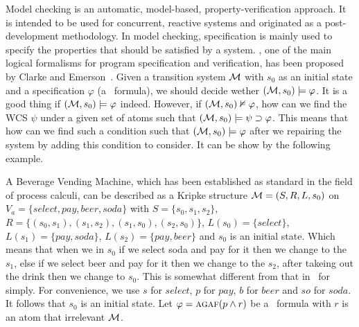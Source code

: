 \documentclass{article}
\begin{document}
Model checking is an automatic, model-based, property-verification approach.
It is intended to be used for concurrent, reactive systems and originated as a post-development methodology.
In model checking, specification is mainly used to specify the properties that should be satisfied by a system. %
\CTL, one of the main logical formalisms for program specification and verification, has been proposed by Clarke and Emerson~\cite{clarke1981design}.
Given a transition system ${\cal M}$ with $s_0$ as an initial state and a specification $\varphi$ (a \CTL\ formula), we should decide wether $({\cal M}, s_0) \models \varphi$. It is a good thing if $({\cal M}, s_0) \models \varphi$ indeed. However, if $({\cal M}, s_0) \nvDash \varphi$, how can we find the WCS $\psi$ under a given set of atoms such that $({\cal M}, s_0) \models \psi \supset \varphi$.
This means that how can we find such a condition such that $({\cal M}, s_0) \models \varphi$ after we repairing the system by adding this condition to consider.
It can be show by the following example.

\begin{example}\label{exmp:1}
A Beverage Vending Machine, which has been established as standard in the field of process calculi, can be described as a Kripke structure ${\cal M}=(S, R, L, s_0)$ on $V_a=\{select, pay, beer, soda\}$ with $S=\{s_0, s_1, s_2\}$, $R=\{(s_0, s_1), (s_1, s_2), (s_1, s_0), (s_2,s_0)\}$, $L(s_0)=\{select\}$, $L(s_1)=\{pay, soda\}$, $L(s_2)=\{pay, beer\}$ and $s_0$ is an initial state.
Which means that when we in $s_0$ if we select soda and pay for it then we change to the $s_1$, else if we select beer and pay for it then we change to the $s_2$, after takeing out the drink then we change to $s_0$. This is somewhat different from that in~\cite{Baier:PMC:2008} for simply.
For convenience, we use $s$ for $select$, $p$ for $pay$, $b$ for $beer$ and $so$ for $soda$.
It follows that $s_0$ is an initial state.
Let $\varphi=\textsc{a}\textsc{g} \textsc{a} \textsc{f}(p\wedge r)$ be a \CTL\ formula with $r$ is an atom that irrelevant ${\cal M}$.
\end{example}
\end{document}
